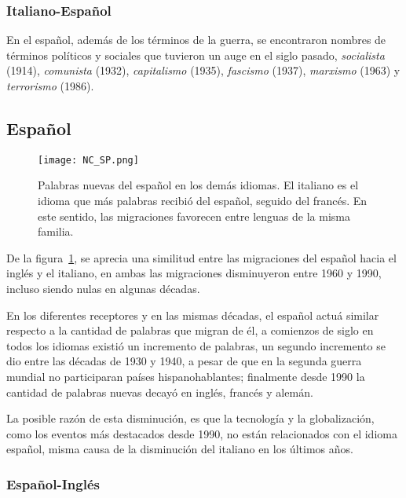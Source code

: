 


\subsubsection*{Italiano-Español}%

En el español, además de los términos de la guerra, se encontraron nombres de términos políticos y sociales que tuvieron un auge en el siglo pasado,  \textit{socialista} (1914), \textit{comunista} (1932), \textit{capitalismo} (1935), \textit{fascismo} (1937),  \textit{marxismo} (1963) y \textit{terrorismo} (1986). 

\subsection{Español}%

\begin{figure} [h!] %
	\centering
	\texttt{[image: NC\_SP.png]}
	\caption{Palabras nuevas del español en los demás idiomas. El italiano es el idioma  que más palabras recibió del español, seguido del francés. En este sentido, las migraciones favorecen entre lenguas de la misma familia.}
	\label{fig.NC_SP}
\end{figure} %

De la figura~\ref{fig.NC_SP}, se aprecia una similitud entre las migraciones del español hacia el inglés y el italiano, en ambas las migraciones disminuyeron entre 1960 y 1990, incluso siendo nulas en algunas décadas. 

En los diferentes receptores y en las mismas décadas, el español actuá similar respecto a la cantidad de palabras que migran de él,  a comienzos de siglo en todos los idiomas existió un incremento de palabras, un segundo incremento se dio entre las décadas de 1930 y 1940, a pesar de que en la segunda guerra mundial no participaran países hispanohablantes; finalmente desde 1990 la cantidad de palabras nuevas decayó en inglés,  francés y alemán.

 La posible razón de esta disminución, es que la tecnología y la globalización, como los eventos más destacados desde 1990,  no están relacionados con el idioma español, misma causa de la disminución del italiano en los últimos años.


\subsubsection*{Español-Inglés}%

